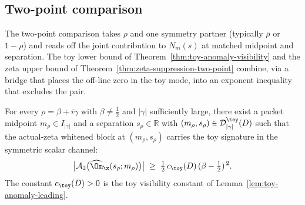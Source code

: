 
\subsection{Two-point comparison}
\label{subsec:two-point-comparison}

The two-point comparison takes \(\rho\) and one symmetry partner
(typically \(\bar\rho\) or \(1-\rho\)) and reads off the joint
contribution to \(N_m(s)\) at matched midpoint and separation.  The
toy lower bound of Theorem~\ref{thm:toy-anomaly-visibility} and the
zeta upper bound of Theorem~\ref{thm:zeta-suppression-two-point}
combine, via a bridge that places the off-line zero in the toy mode,
into an exponent inequality that excludes the pair.

\begin{hypothesis}
\label{hyp:off-line-toy-signature}
For every \(\rho=\beta+i\gamma\) with \(\beta\ne\tfrac12\) and
\(|\gamma|\) sufficiently large, there exist a packet midpoint
\(m_\rho\in I_{|\gamma|}\) and a separation \(s_\rho\in\mathbb R\) with
\((m_\rho,s_\rho)\in\mathcal D_{|\gamma|}^\toy(D)\) such that the
actual-zeta whitened block at \((m_\rho,s_\rho)\) carries the toy
signature in the symmetric scalar channel:
\begin{equation}
\label{eq:off-line-toy-signature}
        \bigl|\mathcal A_2\bigl(\widehat\Om_\z(s_\rho;m_\rho)\bigr)\bigr|
        \;\ge\;
        \tfrac12\,c_\toy(D)\,(\beta-\tfrac12)^{\,2}.
\end{equation}
The constant \(c_\toy(D)>0\) is the toy visibility constant of
Lemma~\ref{lem:toy-anomaly-leading}.
\end{hypothesis}

